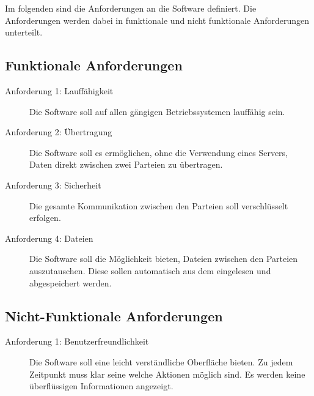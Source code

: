 Im folgenden sind die Anforderungen an die Software definiert. Die Anforderungen werden dabei in funktionale und nicht funktionale Anforderungen unterteilt.

\subsection*{Funktionale Anforderungen}
\begin{description}
\item[Anforderung 1: Lauffähigkeit] Die Software soll auf allen gängigen Betriebssystemen lauffähig sein.
\item[Anforderung 2: Übertragung] Die Software soll es ermöglichen, ohne die Verwendung eines Servers, Daten direkt zwischen zwei Parteien zu übertragen.
\item[Anforderung 3: Sicherheit] Die gesamte Kommunikation zwischen den Parteien soll verschlüsselt erfolgen.
\item[Anforderung 4: Dateien] Die Software soll die Möglichkeit bieten, Dateien zwischen den Parteien auszutauschen. Diese sollen automatisch aus dem eingelesen und abgespeichert werden.   
\end{description}

\subsection*{Nicht-Funktionale Anforderungen}
\begin{description}
\item[Anforderung 1: Benutzerfreundlichkeit] Die Software soll eine leicht verständliche Oberfläche bieten. Zu jedem Zeitpunkt muss klar seine welche Aktionen möglich sind. Es werden keine überflüssigen Informationen angezeigt.
\end{description}